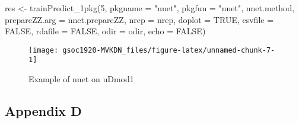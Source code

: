 \begin{Schunk}
\begin{Sinput}
res <- trainPredict_1pkg(5, pkgname = "nnet", pkgfun = "nnet", nnet.method,
  prepareZZ.arg = nnet.prepareZZ, nrep = nrep, doplot = TRUE,
  csvfile = FALSE, rdafile = FALSE, odir = odir, echo = FALSE)
\end{Sinput}
\begin{figure}

{\centering \texttt{[image: gsoc1920-MVKDN\_files/figure-latex/unnamed-chunk-7-1]} 

}

\caption[Example of nnet on uDmod1]{Example of nnet on uDmod1}\label{fig:unnamed-chunk-7}
\end{figure}
\end{Schunk}

\hypertarget{appendix-d}{%
\subsection{Appendix D}\label{appendix-d}}

